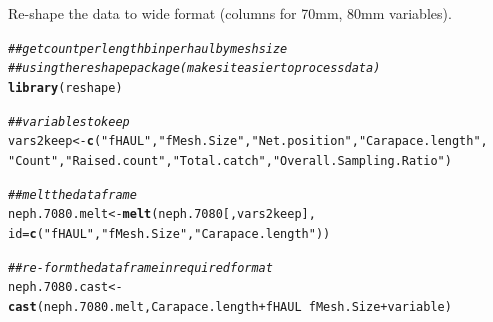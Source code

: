 \documentclass[12pt]{article}\usepackage[]{graphicx}\usepackage[]{color}
\makeatletter
\newcommand{\hlstr}[1]{\textcolor[rgb]{0.192,0.494,0.8}{#1}}%
\newcommand{\hlcom}[1]{\textcolor[rgb]{0.678,0.584,0.686}{\textit{#1}}}%
\newcommand{\hlopt}[1]{\textcolor[rgb]{0,0,0}{#1}}%
\newcommand{\hlstd}[1]{\textcolor[rgb]{0.345,0.345,0.345}{#1}}%
\newcommand{\hlkwb}[1]{\textcolor[rgb]{0.69,0.353,0.396}{#1}}%
\newcommand{\hlkwc}[1]{\textcolor[rgb]{0.333,0.667,0.333}{#1}}%
\newcommand{\hlkwd}[1]{\textcolor[rgb]{0.737,0.353,0.396}{\textbf{#1}}}%
\newenvironment{kframe}{%
 \def\at@end@of@kframe{}%
 \ifinner\ifhmode%
  \def\at@end@of@kframe{\end{minipage}}%
  \begin{minipage}{\columnwidth}%
 \fi\fi%
 \def\FrameCommand##1{\hskip\@totalleftmargin \hskip-\fboxsep
 \colorbox{shadecolor}{##1}\hskip-\fboxsep
     \hskip-\linewidth \hskip-\@totalleftmargin \hskip\columnwidth}%
 \MakeFramed {\advance\hsize-\width
   \@totalleftmargin\z@ \linewidth\hsize
   \@setminipage}}%
 {\par\unskip\endMakeFramed%
 \at@end@of@kframe}
\newenvironment{knitrout}{}{} %
\makeatother
\begin{document}
Re-shape the data to wide format (columns for 70mm, 80mm variables).
\begin{knitrout}\footnotesize
{}\color{fgcolor}\begin{kframe}
\begin{alltt}
\hlcom{## get count per length bin per haul by mesh size}
\hlcom{## using the reshape package (makes it easier to process data)}
\hlkwd{library}\hlstd{(reshape)}

\hlcom{## variables to keep }
\hlstd{vars2keep} \hlkwb{<-} \hlkwd{c}\hlstd{(}\hlstr{"fHAUL"}\hlstd{,} \hlstr{"fMesh.Size"}\hlstd{,} \hlstr{"Net.position"}\hlstd{,} \hlstr{"Carapace.length"}\hlstd{,}
               \hlstr{"Count"}\hlstd{,} \hlstr{"Raised.count"}\hlstd{,} \hlstr{"Total.catch"}\hlstd{,} \hlstr{"Overall.Sampling.Ratio"}\hlstd{)}

\hlcom{## melt the data frame}
\hlstd{neph.7080.melt} \hlkwb{<-} \hlkwd{melt}\hlstd{(neph.7080[, vars2keep],}
                           \hlkwc{id} \hlstd{=} \hlkwd{c}\hlstd{(}\hlstr{"fHAUL"}\hlstd{,} \hlstr{"fMesh.Size"}\hlstd{,} \hlstr{"Carapace.length"}\hlstd{))}

\hlcom{## re-form the dataframe in required format }
\hlstd{neph.7080.cast} \hlkwb{<-} \hlkwd{cast}\hlstd{(neph.7080.melt, Carapace.length} \hlopt{+} \hlstd{fHAUL} \hlopt{~} \hlstd{fMesh.Size}  \hlopt{+} \hlstd{variable)}


\end{alltt}
\end{kframe}
\end{knitrout}
\end{document}
